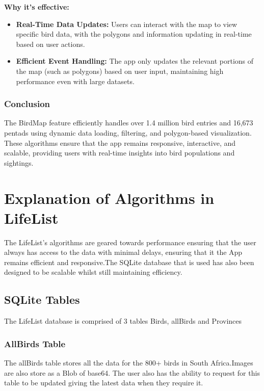 \documentclass[a4paper]{article}
\begin{document}
\textbf{Why it's effective:}
\begin{itemize}
    \item \textbf{Real-Time Data Updates:} Users can interact with the map to view specific bird data, with the polygons and information updating in real-time based on user actions.
    \item \textbf{Efficient Event Handling:} The app only updates the relevant portions of the map (such as polygons) based on user input, maintaining high performance even with large datasets.
\end{itemize}

\subsubsection{Conclusion}
The BirdMap feature efficiently handles over 1.4 million bird entries and 16,673 pentads using dynamic data loading, filtering, and polygon-based visualization. These algorithms ensure that the app remains responsive, interactive, and scalable, providing users with real-time insights into bird populations and sightings.

\section{Explanation of Algorithms in LifeList}
The LifeList's algorithms are geared towards performance ensuring that the user always has access to the data with minimal delays, ensuring that it the App remains efficient and responsive.The SQLite database that is used has also been designed to be scalable whilst still maintaining efficiency. 

\subsection{SQLite Tables}
The LifeList database is comprised of 3 tables Birds, allBirds and Provinces

\subsubsection{AllBirds Table}
The allBirds table stores all the data for the 800+ birds in South Africa.Images are also store as a Blob of base64. The user also has the ability to request for this table to be updated giving the latest data when they require it.
\end{document}
